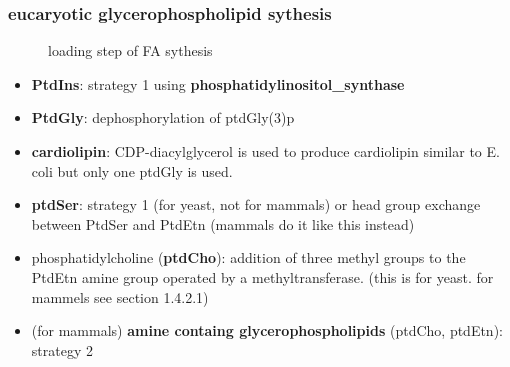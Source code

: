 \documentclass[../main.tex]{subfiles}
\begin{document}
\subsubsection{eucaryotic glycerophospholipid sythesis}
\begin{figure}[H]
	\centering
	\caption{loading step of FA sythesis}
\end{figure}


\begin{itemize}
    \item \textbf{PtdIns}: strategy 1 using \textbf{\gls{phosphatidylinositol_synthase}}
     \item \textbf{PtdGly}: dephosphorylation of ptdGly(3)p
    
    \item \textbf{cardiolipin}: CDP-diacylglycerol is used to produce cardiolipin similar to E. coli but only one ptdGly is used.

    \item \textbf{ptdSer}: strategy 1 (for yeast, not for mammals) or head group exchange between PtdSer and PtdEtn (mammals do it like this instead)
    \item phosphatidylcholine (\textbf{ptdCho}): addition of three methyl groups to the 
    PtdEtn amine group operated by a methyltransferase. (this is for yeast. for mammels see section 1.4.2.1)
    \item (for mammals) \textbf{amine containg glycerophospholipids} (ptdCho, ptdEtn): strategy 2 
\end{itemize}
\end{document}
